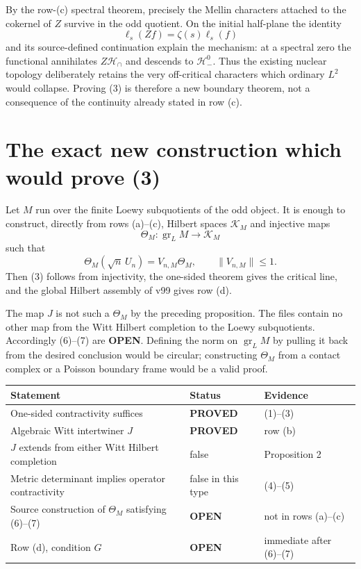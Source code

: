 \documentclass[11pt]{article}
\newcommand{\PROVED}{\textcolor{green!40!black}{\textbf{PROVED}}}
\newcommand{\OPEN}{\textcolor{red!70!black}{\textbf{OPEN}}}
\begin{document}
By the row-(c) spectral theorem, precisely the Mellin characters attached
to the cokernel of $Z$ survive in the odd quotient.  On the initial
half-plane the identity
\[
                     \ell_s(Zf)=\zeta(s)\ell_s(f)
\]
and its source-defined continuation explain the mechanism: at a spectral
zero the functional annihilates $Z\mathcal H_\cap$ and descends to
$\mathcal H_-^0$.  Thus the existing nuclear topology deliberately retains
the very off-critical characters which ordinary $L^2$ would collapse.
Proving (3) is therefore a new boundary theorem, not a consequence of the
continuity already stated in row (c).

\section{The exact new construction which would prove (3)}

Let $M$ run over the finite Loewy subquotients of the odd object.  It is
enough to construct, directly from rows (a)--(c), Hilbert spaces
$\mathscr K_M$ and injective maps
\begin{equation}
 \Theta_M:\operatorname{gr}_LM\longrightarrow\mathscr K_M             \tag{6}
\end{equation}
such that
\begin{equation}
 \Theta_M(\sqrt n\,U_n)=V_{n,M}\Theta_M,
 \qquad \|V_{n,M}\|\le1.                            \tag{7}
\end{equation}
Then (3) follows from injectivity, the one-sided theorem gives the critical
line, and the global Hilbert assembly of v99 gives row (d).

The map $J$ is not such a $\Theta_M$ by the preceding proposition.  The
files contain no other map from the Witt Hilbert completion to the Loewy
subquotients.  Accordingly (6)--(7) are \OPEN.  Defining the norm on
$\operatorname{gr}_LM$ by pulling it back from the desired conclusion
would be circular; constructing $\Theta_M$ from a contact complex or a
Poisson boundary frame would be a valid proof.

\begin{center}
\begin{tabular}{>{\raggedright\arraybackslash}p{.57\linewidth}
                >{\centering\arraybackslash}p{.15\linewidth}
                >{\raggedright\arraybackslash}p{.18\linewidth}}
\toprule
Statement & Status & Evidence \\
\midrule
One-sided contractivity suffices & \PROVED & (1)--(3) \\
Algebraic Witt intertwiner $J$ & \PROVED & row (b) \\
$J$ extends from either Witt Hilbert completion & false & Proposition 2 \\
Metric determinant implies operator contractivity & false in this type & (4)--(5) \\
Source construction of $\Theta_M$ satisfying (6)--(7) & \OPEN & not in rows (a)--(c) \\
Row (d), condition $G$ & \OPEN & immediate after (6)--(7) \\
\bottomrule
\end{tabular}
\end{center}
\end{document}
